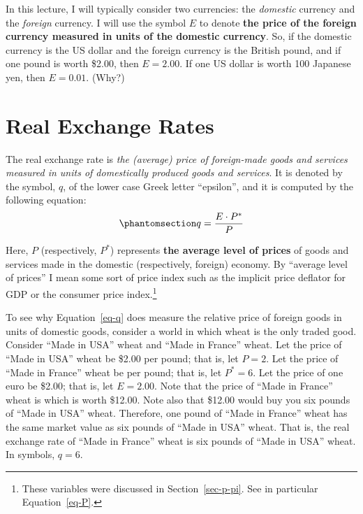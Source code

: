 \documentclass[
  letterpaper,
]{book}
\theoremstyle{plain}
\theoremstyle{remark}
\begin{document}
In this lecture, I will typically consider two currencies: the
\emph{domestic} currency and the \emph{foreign} currency. I will use the
symbol \(E\) to denote \textbf{the price of the foreign currency
measured in units of the domestic currency}. So, if the domestic
currency is the US dollar and the foreign currency is the British pound,
and if one pound is worth \$2.00, then \(E = 2.00\). If one US dollar is
worth 100 Japanese yen, then \(E=0.01\). (Why?)

\section{Real Exchange Rates}\label{sec-realexrates}

The real exchange rate is
\emph{the (average) price of foreign-made goods and services measured in
units of domestically produced goods and services}. It is denoted by the
symbol, \(q\), of the lower case Greek letter ``epsilon'', and it is
computed by the following equation:
\begin{equation}\phantomsection\label{eq-q}{
q=\frac{E\cdot P^*}{P}
}\end{equation}

Here, \(P\) (respectively, \(P^*\)) represents \textbf{the average level
of prices} of goods and services made in the domestic (respectively,
foreign) economy. By ``average level of prices'' I mean some sort of
price index such as the implicit price deflator for GDP or the consumer
price index.\footnote{These variables were
  discussed in Section~\ref{sec-p-pi}. See in particular
  Equation~\ref{eq-P}.}

To see why Equation~\ref{eq-q} does measure the relative price of
foreign goods in units of domestic goods, consider a world in which
wheat is the only traded good. Consider ``Made in USA'' wheat and ``Made
in France'' wheat. Let the price of ``Made in USA'' wheat be \$2.00 per
pound; that is, let \(P=2\). Let the price of ``Made in France'' wheat
be  per pound; that is, let \(P^*=6\). Let the price of one
euro be \$2.00; that is, let \(E=2.00\). Note that the price of ``Made
in France'' wheat is  which is worth \$12.00. Note also that
\$12.00 would buy you six pounds of ``Made in USA'' wheat. Therefore,
one pound of ``Made in France'' wheat has the same market value as six
pounds of ``Made in USA'' wheat. That is, the real exchange rate of
``Made in France'' wheat is six pounds of ``Made in USA'' wheat. In
symbols, \(q=6\).
\end{document}
